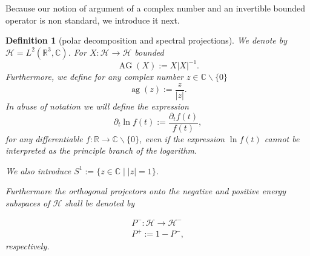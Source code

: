 \documentclass[b5paper,draft,openbib,12pt]{memoir}
\newtheorem{Def}{Definition}
\DeclareMathOperator{\ag}{ag}
\DeclareMathOperator{\AG}{AG}
\begin{document}
Because our notion of argument of a complex number and an 
invertible bounded operator is non standard, we introduce it next. 
\begin{Def}[polar decomposition and spectral projections]
We denote by \(\mathcal{H}=L^2(\mathbb{R}^3,\mathbb{C})\).
For \(X:\mathcal{H}\rightarrow \mathcal{H}\) bounded
\begin{equation}\label{def AG}
\AG(X):=X |X|^{-1}.
\end{equation}
Furthermore, we define for any complex number \(z\in \mathbb{C}\backslash \{0\}\)
\begin{equation}
\ag(z):=\frac{z}{|z|}.
\end{equation}
In abuse of notation we will define the expression
\begin{equation}
\partial_t \ln f(t):=\frac{\partial_t f(t)}{f(t)},
\end{equation}
for any differentiable \(f:\mathbb{R}\rightarrow \mathbb{C}\backslash \{0\} \), 
even if the expression \(\ln f(t)\) cannot be interpreted as the principle
branch of the logarithm.

We also introduce \(S^1:=\{z\in\mathbb{C}\mid |z|=1\}\).

Furthermore the orthogonal projcetors onto the negative and
positive energy
subspaces of \(\mathcal{H}\) shall be denoted by 

\begin{align}\label{def: Ppm}
P^-:\mathcal{H}\rightarrow \mathcal{H}^-\\
P^+:=1-P^-,
\end{align}
respectively.


\end{Def}
\end{document}
